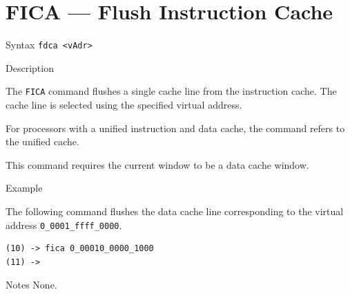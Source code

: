 %
%
\pagebreak
\section*{FICA — Flush Instruction Cache}

\begin{iPageDescEntry}{Syntax}
\texttt{fdca <vAdr>} \\
\end{iPageDescEntry}

\begin{iPageDescEntry}{Description}

The \texttt{FICA} command flushes a single cache line from the instruction cache.
The cache line is selected using the specified virtual address.

For processors with a unified instruction and data cache, the command refers to the unified cache.

This command requires the current window to be a data cache window.

\end{iPageDescEntry}

\begin{iPageDescEntry}{Example}

The following command flushes the data cache line corresponding to the virtual
address \texttt{0\_0001\_ffff\_0000}.

\begin{lstlisting}[style=iPageOpStyle]
(10) -> fica 0_00010_0000_1000
(11) ->
\end{lstlisting}

\end{iPageDescEntry}

\begin{iPageDescEntry}{Notes}
None.
\end{iPageDescEntry}
